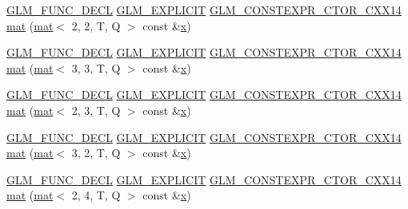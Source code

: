 \begin{DoxyCompactItemize}
\item 
\hyperlink{setup_8hpp_ab2d052de21a70539923e9bcbf6e83a51}{G\+L\+M\+\_\+\+F\+U\+N\+C\+\_\+\+D\+E\+CL} \hyperlink{setup_8hpp_a6c74f5a5e7b134ab69023ff9a30d4d5d}{G\+L\+M\+\_\+\+E\+X\+P\+L\+I\+C\+IT} \hyperlink{setup_8hpp_a0900f9145e68bf6061b6f5e7be3fa751}{G\+L\+M\+\_\+\+C\+O\+N\+S\+T\+E\+X\+P\+R\+\_\+\+C\+T\+O\+R\+\_\+\+C\+X\+X14} \hyperlink{structglm_1_1mat_3_014_00_014_00_01_t_00_01_q_01_4_af34b49a74f86be5b806f00f062a47381}{mat} (\hyperlink{structglm_1_1mat}{mat}$<$ 2, 2, T, Q $>$ const \&\hyperlink{_s_d_l__opengl_8h_ad0e63d0edcdbd3d79554076bf309fd47}{x})
\item 
\hyperlink{setup_8hpp_ab2d052de21a70539923e9bcbf6e83a51}{G\+L\+M\+\_\+\+F\+U\+N\+C\+\_\+\+D\+E\+CL} \hyperlink{setup_8hpp_a6c74f5a5e7b134ab69023ff9a30d4d5d}{G\+L\+M\+\_\+\+E\+X\+P\+L\+I\+C\+IT} \hyperlink{setup_8hpp_a0900f9145e68bf6061b6f5e7be3fa751}{G\+L\+M\+\_\+\+C\+O\+N\+S\+T\+E\+X\+P\+R\+\_\+\+C\+T\+O\+R\+\_\+\+C\+X\+X14} \hyperlink{structglm_1_1mat_3_014_00_014_00_01_t_00_01_q_01_4_ab1d24b7675d5ddaca808cad45a43ab9a}{mat} (\hyperlink{structglm_1_1mat}{mat}$<$ 3, 3, T, Q $>$ const \&\hyperlink{_s_d_l__opengl_8h_ad0e63d0edcdbd3d79554076bf309fd47}{x})
\item 
\hyperlink{setup_8hpp_ab2d052de21a70539923e9bcbf6e83a51}{G\+L\+M\+\_\+\+F\+U\+N\+C\+\_\+\+D\+E\+CL} \hyperlink{setup_8hpp_a6c74f5a5e7b134ab69023ff9a30d4d5d}{G\+L\+M\+\_\+\+E\+X\+P\+L\+I\+C\+IT} \hyperlink{setup_8hpp_a0900f9145e68bf6061b6f5e7be3fa751}{G\+L\+M\+\_\+\+C\+O\+N\+S\+T\+E\+X\+P\+R\+\_\+\+C\+T\+O\+R\+\_\+\+C\+X\+X14} \hyperlink{structglm_1_1mat_3_014_00_014_00_01_t_00_01_q_01_4_a6d8e94f1c180fee1eab67eeac6d1ebfb}{mat} (\hyperlink{structglm_1_1mat}{mat}$<$ 2, 3, T, Q $>$ const \&\hyperlink{_s_d_l__opengl_8h_ad0e63d0edcdbd3d79554076bf309fd47}{x})
\item 
\hyperlink{setup_8hpp_ab2d052de21a70539923e9bcbf6e83a51}{G\+L\+M\+\_\+\+F\+U\+N\+C\+\_\+\+D\+E\+CL} \hyperlink{setup_8hpp_a6c74f5a5e7b134ab69023ff9a30d4d5d}{G\+L\+M\+\_\+\+E\+X\+P\+L\+I\+C\+IT} \hyperlink{setup_8hpp_a0900f9145e68bf6061b6f5e7be3fa751}{G\+L\+M\+\_\+\+C\+O\+N\+S\+T\+E\+X\+P\+R\+\_\+\+C\+T\+O\+R\+\_\+\+C\+X\+X14} \hyperlink{structglm_1_1mat_3_014_00_014_00_01_t_00_01_q_01_4_a73ea0df2dd55ad264a66e28289fa4847}{mat} (\hyperlink{structglm_1_1mat}{mat}$<$ 3, 2, T, Q $>$ const \&\hyperlink{_s_d_l__opengl_8h_ad0e63d0edcdbd3d79554076bf309fd47}{x})
\item 
\hyperlink{setup_8hpp_ab2d052de21a70539923e9bcbf6e83a51}{G\+L\+M\+\_\+\+F\+U\+N\+C\+\_\+\+D\+E\+CL} \hyperlink{setup_8hpp_a6c74f5a5e7b134ab69023ff9a30d4d5d}{G\+L\+M\+\_\+\+E\+X\+P\+L\+I\+C\+IT} \hyperlink{setup_8hpp_a0900f9145e68bf6061b6f5e7be3fa751}{G\+L\+M\+\_\+\+C\+O\+N\+S\+T\+E\+X\+P\+R\+\_\+\+C\+T\+O\+R\+\_\+\+C\+X\+X14} \hyperlink{structglm_1_1mat_3_014_00_014_00_01_t_00_01_q_01_4_a365699059ac33f90799da991da78463e}{mat} (\hyperlink{structglm_1_1mat}{mat}$<$ 2, 4, T, Q $>$ const \&\hyperlink{_s_d_l__opengl_8h_ad0e63d0edcdbd3d79554076bf309fd47}{x})

\end{DoxyCompactItemize}
